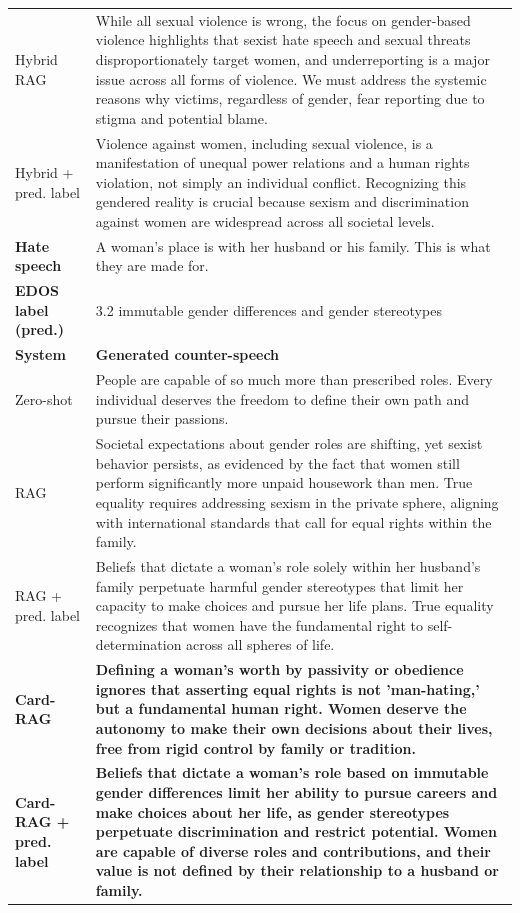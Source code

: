 \begin{table}[t]
\begin{tabularx}{\textwidth}{@{}p{}X@{}}
Hybrid RAG & While all sexual violence is wrong, the focus on gender-based violence highlights that sexist hate speech and sexual threats disproportionately target women, and underreporting is a major issue across all forms of violence. We must address the systemic reasons why victims, regardless of gender, fear reporting due to stigma and potential blame. \\
Hybrid + pred. label & Violence against women, including sexual violence, is a manifestation of unequal power relations and a human rights violation, not simply an individual conflict. Recognizing this gendered reality is crucial because sexism and discrimination against women are widespread across all societal levels. \\
\midrule[\heavyrulewidth]
\textbf{Hate speech} & A woman's place is with her husband or his family. This is what they are made for. \\
\textbf{EDOS label (pred.)} & 3.2 immutable gender differences and gender stereotypes \\
\midrule
\textbf{System} & \textbf{Generated counter-speech} \\
Zero-shot & People are capable of so much more than prescribed roles. Every individual deserves the freedom to define their own path and pursue their passions. \\
RAG & Societal expectations about gender roles are shifting, yet sexist behavior persists, as evidenced by the fact that women still perform significantly more unpaid housework than men. True equality requires addressing sexism in the private sphere, aligning with international standards that call for equal rights within the family. \\
RAG + pred. label & Beliefs that dictate a woman's role solely within her husband's family perpetuate harmful gender stereotypes that limit her capacity to make choices and pursue her life plans. True equality recognizes that women have the fundamental right to self-determination across all spheres of life. \\
\textbf{Card-RAG} & \textbf{Defining a woman's worth by passivity or obedience ignores that asserting equal rights is not 'man-hating,' but a fundamental human right. Women deserve the autonomy to make their own decisions about their lives, free from rigid control by family or tradition.} \\
\textbf{Card-RAG + pred. label} & \textbf{Beliefs that dictate a woman's role based on immutable gender differences limit her ability to pursue careers and make choices about her life, as gender stereotypes perpetuate discrimination and restrict potential. Women are capable of diverse roles and contributions, and their value is not defined by their relationship to a husband or family.} \\

\end{tabularx}
\end{table}
